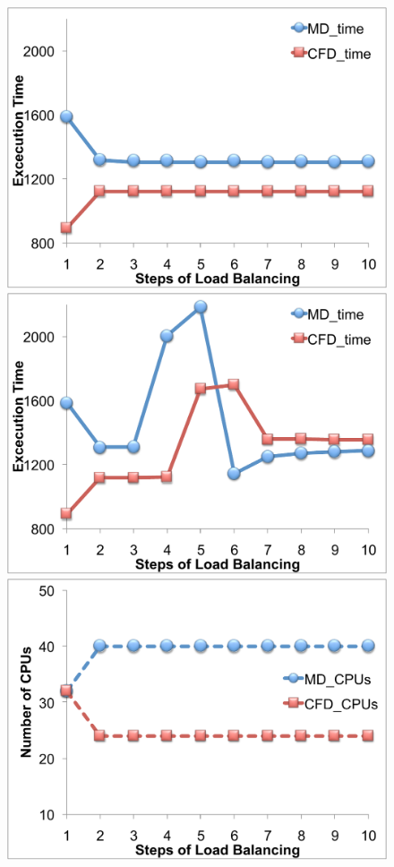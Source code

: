 \documentclass[conference,final]{IEEEtran}
\begin{document}
\begin{figure}
\centering
\includegraphics[scale=0.21]{fig7_11.pdf}
\includegraphics[scale=0.21]{fig7_21.pdf}
\linebreak
\includegraphics[scale=0.21]{fig7_12.pdf}

\end{figure}
\end{document}
